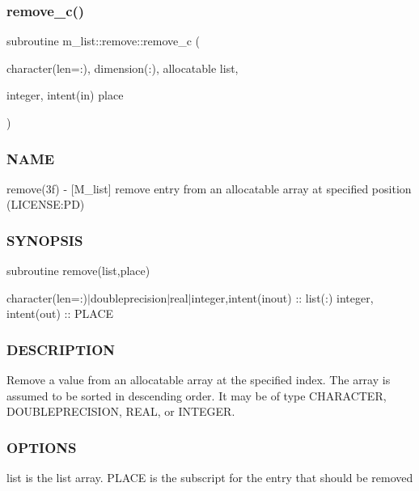 \subsubsection{\texorpdfstring{remove\+\_\+c()}{remove\_c()}}
{\footnotesize\ttfamily subroutine m\+\_\+list\+::remove\+::remove\+\_\+c (\begin{DoxyParamCaption}\item[{character(len=\+:), dimension(\+:), allocatable}]{list,  }\item[{integer, intent(in)}]{place }\end{DoxyParamCaption})\hspace{0.3cm}{\ttfamily [private]}}



\subsubsection*{N\+A\+ME}

remove(3f) -\/ \mbox{[}M\+\_\+list\mbox{]} remove entry from an allocatable array at specified position (L\+I\+C\+E\+N\+SE\+:PD) 

\subsubsection*{S\+Y\+N\+O\+P\+S\+IS}

subroutine remove(list,place)

character(len=\+:)$\vert$doubleprecision$\vert$real$\vert$integer,intent(inout) \+:\+: list(\+:) integer, intent(out) \+:\+: P\+L\+A\+CE

\subsubsection*{D\+E\+S\+C\+R\+I\+P\+T\+I\+ON}

\begin{DoxyVerb}Remove a value from an allocatable array at the specified index.
The array is assumed to be sorted in descending order. It may be of
type CHARACTER, DOUBLEPRECISION, REAL, or INTEGER.
\end{DoxyVerb}


\subsubsection*{O\+P\+T\+I\+O\+NS}

\begin{DoxyVerb}list    is the list array.
PLACE   is the subscript for the entry that should be removed
\end{DoxyVerb}


